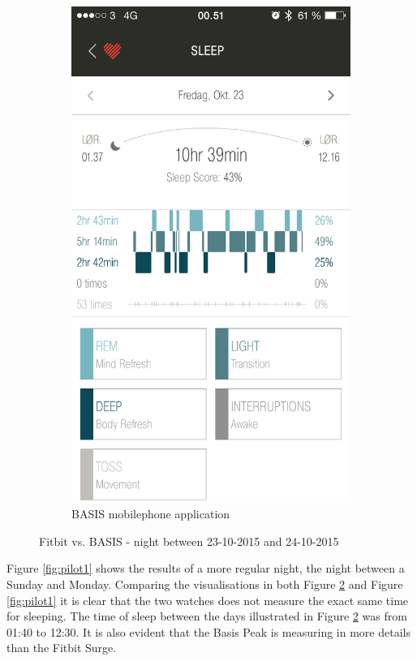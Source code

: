 \documentclass[12pt]{article} %
\begin{document}
\begin{figure}[H]
\begin{subfigure}[b]{0.45\textwidth}
        \includegraphics[width=\textwidth]{img/24-10-basis}
        \caption{BASIS mobilephone application}
        \label{fig:basis0}
    \end{subfigure}
    \caption{Fitbit vs. BASIS - night between 23-10-2015 and 24-10-2015}
    \label{fig:pilot0}
\end{figure}

Figure \ref{fig:pilot1} shows the results of a more regular night, the night between a Sunday and Monday. Comparing the visualisations in both Figure \ref{fig:pilot0} and Figure \ref{fig:pilot1} it is clear that the two watches does not measure the exact same time for sleeping. The time of sleep between the days illustrated in Figure \ref{fig:pilot0} was from 01:40 to 12:30. It is also evident that the Basis Peak is measuring in more details than the Fitbit Surge. \\
\end{document}
